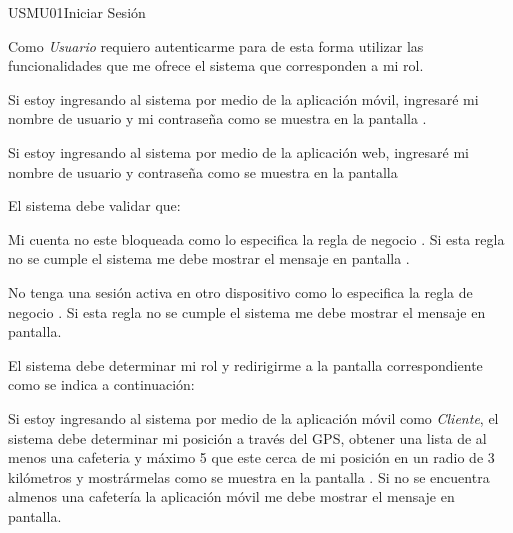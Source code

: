 \begin{UserStory}{USMU01}{Iniciar Sesión}{Como \textit{Usuario} requiero autenticarme para de esta forma utilizar las funcionalidades que me ofrece el sistema que corresponden a mi rol.
	\begin{Citemize}
		\item Si estoy ingresando al sistema por medio de la aplicación móvil, ingresaré mi nombre de usuario y mi contraseña como se muestra en la pantalla .
		\item Si estoy ingresando al sistema por medio de la aplicación web, ingresaré mi nombre de usuario y contraseña como se muestra en la pantalla 
	\end{Citemize}
	
	El sistema debe validar que:
		\begin{Citemize}
			\item Mi cuenta no este bloqueada como lo especifica la regla de negocio . Si esta regla no se cumple el sistema me debe mostrar el mensaje  en pantalla .
			
			\item No tenga una sesión activa en otro dispositivo como lo especifica la regla de negocio . Si esta regla no se cumple el sistema me debe mostrar el mensaje en pantalla.
		\end{Citemize}
		
	El sistema debe determinar mi rol y redirigirme a la pantalla correspondiente como se indica a continuación:
		\begin{Citemize}
			\item Si estoy ingresando al sistema por medio de la aplicación móvil como \textit{Cliente}, el sistema debe determinar mi posición a través del GPS, obtener una lista de al menos una cafeteria y máximo 5 que este cerca de mi posición en un radio de 3 kilómetros y mostrármelas como se muestra en la pantalla . Si no se encuentra almenos una cafetería la aplicación móvil me debe mostrar el mensaje  en pantalla.
		\end{Citemize}
	
}
\end{UserStory}